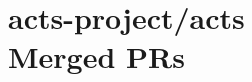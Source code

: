\providecommand{\prmerged}{MERGED }
\providecommand{\propen}{OPEN }
\providecommand{\prwip}{WIP }
\providecommand{\prstale}{STALE }
\providecommand{\iss}{}
    

\providecommand{\cusemoji}[1]{}
\providecommand{\emojispace}[1]{}

\providecommand{\prstr}[1]{PR\##1}
\providecommand{\issstr}[1]{Issue\##1}












\section{ acts-project/acts \\ Merged PRs}

